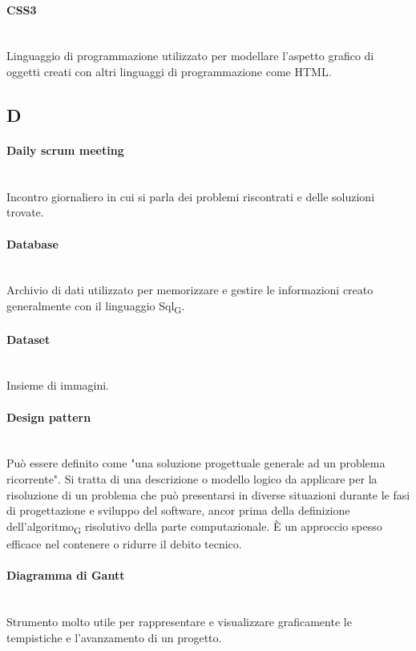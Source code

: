 \paragraph{CSS3}~\smallskip \\
Linguaggio di programmazione utilizzato per modellare l'aspetto grafico di oggetti creati con altri linguaggi di programmazione come HTML.
\newpage
{}
\subsection*{D}
\paragraph{Daily scrum meeting}~\smallskip \\
Incontro giornaliero in cui si parla dei problemi riscontrati e delle soluzioni trovate.

\paragraph{Database}~\smallskip \\
Archivio di dati utilizzato per memorizzare e gestire le informazioni creato generalmente con il linguaggio Sql\textsubscript{G}.

\paragraph{Dataset}~\smallskip \\
Insieme di immagini.

\paragraph{Design pattern}~\smallskip \\
Può essere definito come "una soluzione progettuale generale ad un problema ricorrente".
Si tratta di una descrizione o modello logico da applicare per la risoluzione di un problema che può 
presentarsi in diverse situazioni durante le fasi di progettazione e sviluppo del software, ancor prima della definizione 
dell'algoritmo\textsubscript{G} risolutivo della parte computazionale. È un approccio spesso efficace nel contenere o ridurre il debito tecnico.

\paragraph{Diagramma di Gantt}~\smallskip \\
Strumento molto utile per rappresentare e visualizzare graficamente le tempistiche e l'avanzamento di un progetto.

